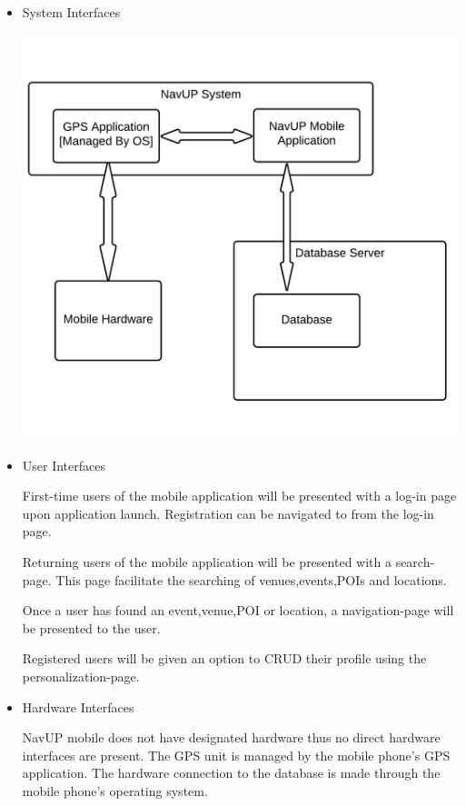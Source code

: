 ﻿\documentclass{article}
\begin{document}
		\begin{itemize}
		    \pagebreak
			\item System Interfaces
			
			\includegraphics[scale=.7]{blockDiagramSystemInterface}
			\item User Interfaces
			
			First-time users of the mobile application will be presented with a log-in page upon application launch. Registration can be navigated to from the log-in page.
			
			Returning users of the mobile application will be presented with a search-page. This page facilitate the searching of venues,events,POIs and locations.
			
			Once a user has found an event,venue,POI or location, a navigation-page will be presented to the user.
			
			Registered users will be given an option to CRUD their profile using the personalization-page.
			
			
			\item Hardware Interfaces
			
			NavUP mobile does not have designated hardware thus no direct hardware interfaces are present. The GPS unit is managed by the mobile phone's GPS application. The hardware connection to the database is made through the mobile phone's operating system.
			

\end{itemize}
\end{document}
